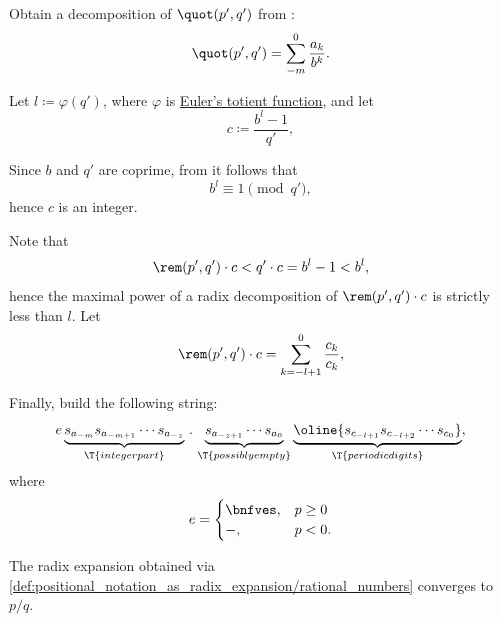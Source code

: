 \begin{algorithm}
\begin{thmenum}
     Obtain a decomposition of \( \quot(p', q') \) from :
    \begin{equation}\label{eq:alg:rational_number_to_positional_string/int}
      \quot(p', q') = \sum_{-m}^0 \frac {a_k} {b^k}.
    \end{equation}

     Let \( l \coloneqq \varphi(q') \), where \( \varphi \) is \hyperref[def:eulers_totient_function]{Euler's totient function}, and let
    \begin{equation}\label{eq:alg:rational_number_to_positional_string/periodic/c}
      c \coloneqq \frac {b^l - 1} {q'},
    \end{equation}

    Since \( b \) and \( q' \) are coprime, from  it follows that
    \begin{equation*}
      b^l \equiv 1 \pmod {q'},
    \end{equation*}
    hence \( c \) is an integer.

    Note that
    \begin{equation}\label{eq:alg:rational_number_to_positional_string/periodic/digit_inequality}
      \rem(p', q') \cdot c < q' \cdot c = b^l - 1 < b^l,
    \end{equation}
    hence the maximal power of a radix decomposition of \( \rem(p', q') \cdot c \) is strictly less than \( l \). Let
    \begin{equation}\label{eq:alg:rational_number_to_positional_string/periodic}
      \rem(p', q') \cdot c = \sum_{k={-l+1}}^0 \frac {c_k} {c_k},
    \end{equation}

     Finally, build the following string:
    \begin{equation}\label{eq:alg:rational_number_to_positional_string/string}
      e \underbrace{s_{a_{-m}} s_{a_{-m+1}} \cdots s_{a_{-z}}}_{\T{integer part}} \thinspace . \thinspace \underbrace{s_{a_{-z+1}} \cdots s_{a_0}}_{\T{possibly empty}} \underbrace{\oline{s_{c_{-l+1}} s_{c_{-l+2}} \cdots s_{c_0}}}_{\T{periodic digits}},
    \end{equation}
    where
    \begin{equation*}
      e = \begin{cases}
        \bnfves, &p \geq 0 \\
        -,      &p < 0.
      \end{cases}
    \end{equation*}

    The radix expansion obtained via \cref{def:positional_notation_as_radix_expansion/rational_numbers} converges to \( p / q \).
  \end{thmenum}
\end{algorithm}
